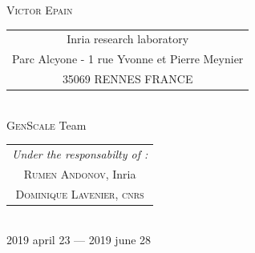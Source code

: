 \begin{titlepage}
\begin{center}
        \LARGE\textsc{Victor Epain} \\[0.5cm]

        \begin{tabular}{c}
          \LARGE{Inria research laboratory} \\
          \normalsize{Parc Alcyone - 1 rue Yvonne et Pierre Meynier} \\
          \normalsize{35069 RENNES FRANCE} \\
        \end{tabular} \\[1cm]

        \LARGE{\textsc{GenScale} Team} \\[0.5cm]

        \begin{tabular}{c}
          \large{\emph{Under the responsabilty of :}} \\
          \textsc{Rumen Andonov}, Inria \\
          \textsc{Dominique Lavenier}, \textsc{cnrs} \\
        \end{tabular} \\

        \vfill
        {\large 2019 april 23 — 2019 june 28}

    \end{center}

\end{titlepage}